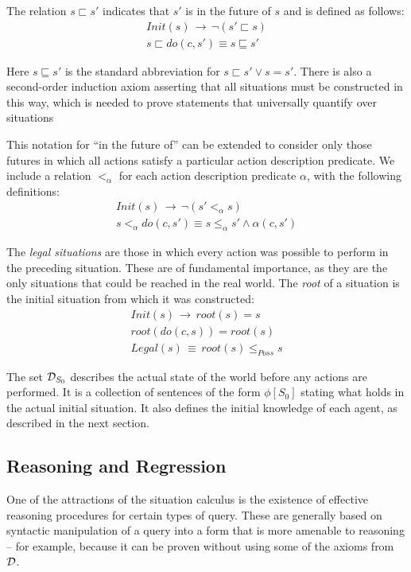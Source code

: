 The relation $s\sqsubset s'$ indicates that $s'$ is in the future
of $s$ and is defined as follows:\begin{gather*}
Init(s)\,\rightarrow\,\neg(s'\sqsubset s)\\
s\sqsubset do(c,s')\equiv s\sqsubseteq s'\end{gather*}


Here $s\sqsubseteq s'$ is the standard abbreviation for $s\sqsubset s'\vee s=s'$.
There is also a second-order induction axiom asserting that all situations
must be constructed in this way, which is needed to prove statements
that universally quantify over situations

This notation for {}``in the future of'' can be extended to consider
only those futures in which all actions satisfy a particular action
description predicate. We include a relation $<_{\alpha}$ for each
action description predicate $\alpha$, with the following definitions:\begin{gather*}
Init(s)\,\rightarrow\,\neg\left(s'<_{\alpha}s\right)\\
s<_{\alpha}do(c,s')\equiv s\leq_{\alpha}s'\wedge\alpha(c,s')\end{gather*}


The \emph{legal situations} are those in which every action was possible
to perform in the preceding situation. These are of fundamental importance,
as they are the only situations that could be reached in the real
world. The \emph{root} of a situation is the initial situation from
which it was constructed:\begin{gather*}
Init(s)\,\rightarrow\, root(s)=s\\
root(do(c,s))=root(s)\\
Legal(s)\,\equiv\, root(s)\leq_{Poss}s\end{gather*}


The set $\mathcal{D}_{S_{0}}$ describes the actual state of the world before
any actions are performed. It is a collection of sentences of the
form $\phi[S_{0}]$ stating what holds in the actual initial situation.
It also defines the initial knowledge of each agent, as described
in the next section.


\subsection{Reasoning and Regression}

One of the attractions of the situation calculus is the existence
of effective reasoning procedures for certain types of query. These
are generally based on syntactic manipulation of a query into a form
that is more amenable to reasoning -- for example, because it can
be proven without using some of the axioms from $\mathcal{D}$.

